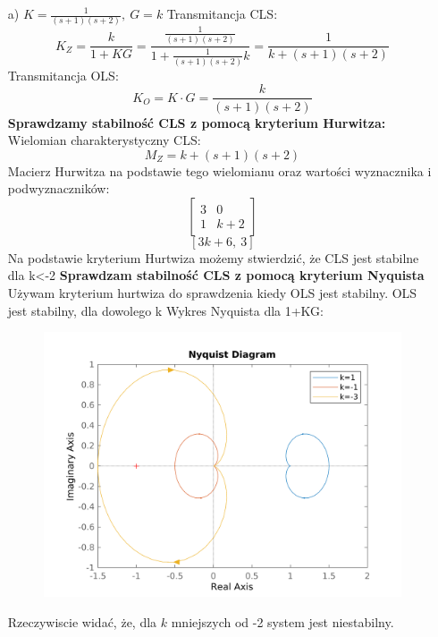 \documentclass{article}
\begin{document}
\begin{itemize}
    
    \item[a)] $K=\frac{1}{\left(s + 1\right) \left(s + 2\right)}, \ G=k$
    Transmitancja CLS:
    $$K_Z=\frac{k}{1+KG}=\frac{\frac{1}{\left(s + 1\right) \left(s + 2\right)}}{1+\frac{1}{\left(s + 1\right) \left(s + 2\right)}k}=\frac{1}{k + \left(s + 1\right) \left(s + 2\right)}$$
    Transmitancja OLS:
    $$K_O=K\cdot G=\frac{k}{\left(s + 1\right) \left(s + 2\right)}$$
    \textbf{Sprawdzamy stabilność CLS z pomocą kryterium Hurwitza:}\newline
    Wielomian charakterystyczny CLS:
    $$M_Z=k + \left(s + 1\right) \left(s + 2\right)$$
    Macierz Hurwitza na podstawie tego wielomianu oraz wartości wyznacznika i podwyznaczników:
    $$\left[\begin{matrix}3 & 0\\1 & k + 2\end{matrix}\right]$$
    $$\left[ 3 k + 6, \  3\right]$$
    Na podstawie kryterium Hurtwiza możemy stwierdzić, że CLS jest stabilne dla k<-2
    \newline\textbf{Sprawdzam stabilność CLS z pomocą kryterium Nyquista}\newline
    Używam kryterium hurtwiza do sprawdzenia kiedy OLS jest stabilny. OLS jest stabilny, dla dowolego k
    Wykres Nyquista dla 1+KG:
    \begin{figure}
        \includegraphics[scale=0.8]{a.png}
        \centering
    \end{figure}
    Rzeczywiscie widać, że, dla $k$ mniejszych od -2 system jest niestabilny.
    \newpage            


\end{itemize}
\end{document}
